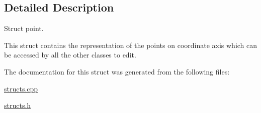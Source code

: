 \subsection{Detailed Description}
Struct point. 

This struct contains the representation of the points on coordinate axis which can be accessed by all the other classes to edit. 

The documentation for this struct was generated from the following files\+:\begin{DoxyCompactItemize}
\item 
\hyperlink{structs_8cpp}{structs.\+cpp}\item 
\hyperlink{structs_8h}{structs.\+h}\end{DoxyCompactItemize}
